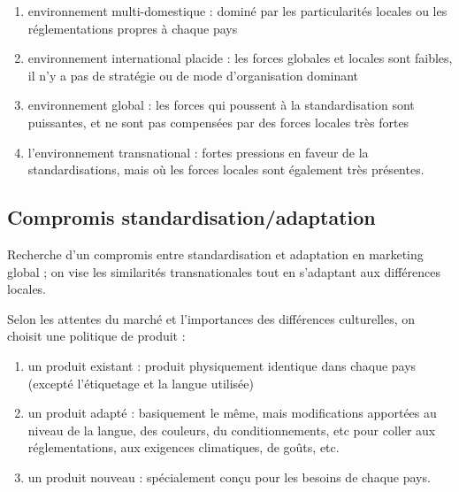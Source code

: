 		\begin{enumerate}
			\item environnement multi-domestique : dominé par les particularités locales ou les réglementations propres à chaque pays
			\item environnement international placide : les forces globales et locales sont faibles, il n'y a pas de stratégie ou de mode d'organisation dominant
			\item environnement global : les forces qui poussent à la standardisation sont puissantes, et ne sont pas compensées par des forces locales très fortes
			\item l'environnement transnational : fortes pressions en faveur de la standardisations, mais où les forces locales sont également très présentes.
		\end{enumerate}
		
		\subsection{Compromis standardisation/adaptation}
		
		Recherche d'un compromis entre standardisation et adaptation en marketing global ; on vise les similarités transnationales tout en s'adaptant aux différences locales.

		
		Selon les attentes du marché et l'importances des différences culturelles, on choisit une politique de produit :
		\begin{enumerate}
			\item un produit existant : produit physiquement identique dans chaque pays (excepté l'étiquetage et la langue utilisée)
			\item un produit adapté : basiquement le même, mais modifications apportées au niveau de la langue, des couleurs, du conditionnements, etc pour coller aux réglementations, aux exigences climatiques, de goûts, etc.
			\item un produit nouveau : spécialement conçu pour les besoins de chaque pays.
		\end{enumerate}
		